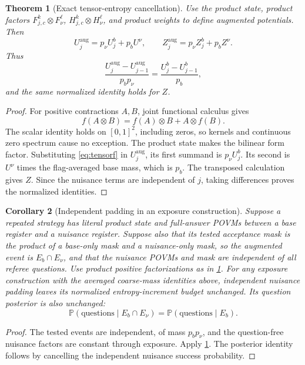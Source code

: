 \documentclass[11pt,reqno]{amsart}
\numberwithin{equation}{section}
\newtheorem{theorem}{Theorem}[section]
\newtheorem{corollary}[theorem]{Corollary}
\theoremstyle{definition}
\theoremstyle{remark}
\newcommand{\Pp}{\mathbb P}
\begin{document}
\begin{theorem}[Exact tensor-entropy cancellation]\label{thm:cancellation}
Use the product state, product factors
\(F_{j,c}^k\otimes F_\nu^\ell\),
\(H_{j,c}^k\otimes H_\nu^\ell\), and product weights to define augmented potentials. Then
\begin{equation}\label{eq:cancellation}
 U_j^{\mathrm{aug}}=p_\nu U_j^b+p_bU^\nu,\qquad
 Z_j^{\mathrm{aug}}=p_\nu Z_j^b+p_bZ^\nu .
\end{equation}
Thus
\[
 \frac{U_j^{\mathrm{aug}}-U_{j-1}^{\mathrm{aug}}}{p_bp_\nu}
 =\frac{U_j^b-U_{j-1}^b}{p_b},
\]
and the same normalized identity holds for \(Z\).
\end{theorem}
\begin{proof}
For positive contractions \(A,B\), joint functional calculus gives
\begin{equation}\label{eq:tensorf}
 f(A\otimes B)=f(A)\otimes B+A\otimes f(B).
\end{equation}
The scalar identity holds on \([0,1]^2\), including zeros, so kernels and continuous zero spectrum cause no exception. The product state makes the bilinear form factor. Substituting \eqref{eq:tensorf} in \(U_j^{\mathrm{aug}}\), its first summand is \(p_\nu U_j^b\). Its second is \(U^\nu\) times the flag-averaged base mass, which is \(p_b\). The transposed calculation gives \(Z\). Since the nuisance terms are independent of \(j\), taking differences proves the normalized identities.
\end{proof}

\begin{corollary}[Independent padding in an exposure construction]\label{cor:padding}
Suppose a repeated strategy has literal product state and full-answer POVMs between a base register and a nuisance register. Suppose also that its tested acceptance mask is the product of a base-only mask and a nuisance-only mask, so the augmented event is \(E_b\cap E_\nu\), and that the nuisance POVMs and mask are independent of all referee questions. Use product positive factorizations as in \cref{thm:cancellation}. For any exposure construction with the averaged coarse-mass identities above, independent nuisance padding leaves its normalized entropy-increment budget unchanged. Its question posterior is also unchanged:
\[
 \Pp(\text{questions}\mid E_b\cap E_\nu)
 =\Pp(\text{questions}\mid E_b).
\]
\end{corollary}
\begin{proof}
The tested events are independent, of mass \(p_bp_\nu\), and the question-free nuisance factors are constant through exposure. Apply \cref{thm:cancellation}. The posterior identity follows by cancelling the independent nuisance success probability.
\end{proof}
\end{document}
